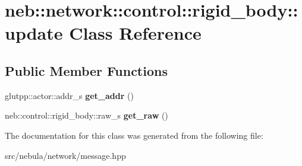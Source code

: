 \hypertarget{classneb_1_1network_1_1control_1_1rigid__body_1_1update}{
\section{neb::network::control::rigid\_\-body::update Class Reference}
\label{classneb_1_1network_1_1control_1_1rigid__body_1_1update}
}
\subsection*{Public Member Functions}
\begin{DoxyCompactItemize}
\item 
\hypertarget{classneb_1_1network_1_1control_1_1rigid__body_1_1update_a4dbab97fac5f7d43af6c6bcb96f5f36f}{
glutpp::actor::addr\_\-s {\bfseries get\_\-addr} ()}
\label{classneb_1_1network_1_1control_1_1rigid__body_1_1update_a4dbab97fac5f7d43af6c6bcb96f5f36f}

\item 
\hypertarget{classneb_1_1network_1_1control_1_1rigid__body_1_1update_ab176f1660a245cb5789e5f923c056843}{
neb::control::rigid\_\-body::raw\_\-s {\bfseries get\_\-raw} ()}
\label{classneb_1_1network_1_1control_1_1rigid__body_1_1update_ab176f1660a245cb5789e5f923c056843}

\end{DoxyCompactItemize}


The documentation for this class was generated from the following file:\begin{DoxyCompactItemize}
\item 
src/nebula/network/message.hpp\end{DoxyCompactItemize}
